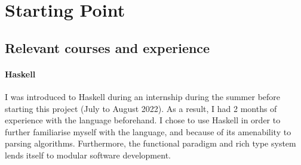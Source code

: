 \documentclass[12pt,a4paper,twoside,openright]{report}
\theoremstyle{definition}
\begin{document}
%
\section{Starting Point}

\subsection{Relevant courses and experience}

\paragraph{Haskell}{I was introduced to Haskell during an internship during the summer before starting this project (July to August 2022). As a result, I had 2 months of experience with the language beforehand. I chose to use Haskell in order to further familiarise myself with the language, and because of its amenability to parsing algorithms. Furthermore, the functional paradigm and rich type system lends itself to modular software development.}
\end{document}

